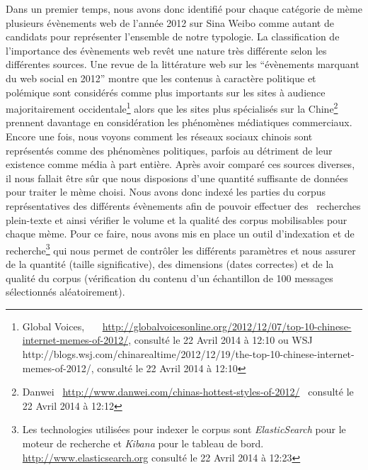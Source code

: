 Dans un premier temps, nous avons donc identifi\'e pour chaque
cat\'egorie de m\`eme plusieurs \'ev\`enements web de
l{\textquoteright}ann\'ee 2012 sur Sina Weibo comme autant de candidats
pour repr\'esenter l{\textquoteright}ensemble de notre typologie. La
classification de l{\textquoteright}importance des \'ev\`enements web
rev\^et une nature tr\`es diff\'erente selon les diff\'erentes sources.
Une revue de la litt\'erature web sur les
{\textquotedblleft}\'ev\`enements marquant du web social en
2012{\textquotedblright} montre que les contenus \`a caract\`ere
politique et pol\'emique sont consid\'er\'es comme plus importants sur
les sites \`a audience majoritairement occidentale\footnote{ Global
Voices,
\ \ \ \url{http://globalvoicesonline.org/2012/12/07/top-10-chinese-internet-memes-of-2012/,}
consult\'e le 22 Avril 2014 \`a 12:10 ou WSJ
http://blogs.wsj.com/chinarealtime/2012/12/19/the-top-10-chinese-internet-memes-of-2012/,
consult\'e le 22 Avril 2014 \`a 12:10 } alors que les sites plus
sp\'ecialis\'es sur la Chine\footnote{ Danwei
\ \url{http://www.danwei.com/chinas-hottest-styles-of-2012/}
\ consult\'e le 22 Avril 2014 \`a 12:12} prennent davantage en
consid\'eration les ph\'enom\`enes m\'ediatiques commerciaux. Encore
une fois, nous voyons comment les r\'eseaux sociaux chinois sont
repr\'esent\'es comme des ph\'enom\`enes politiques, parfois au
d\'etriment de leur existence comme m\'edia \`a part enti\`ere. Apr\`es
avoir compar\'e ces sources diverses, il nous fallait \^etre s\^ur que
nous disposions d{\textquoteright}une quantit\'e suffisante de
donn\'ees pour traiter le m\`eme choisi. Nous avons donc index\'e les
parties du corpus repr\'esentatives des diff\'erents \'ev\`enements
afin de pouvoir effectuer des \ recherches plein-texte et ainsi
v\'erifier le volume et la qualit\'e des corpus mobilisables pour
chaque m\`eme. Pour ce faire, nous avons mis en place un outil
d{\textquoteright}indexation et de recherche\footnote{ Les technologies
utilis\'ees pour indexer le corpus sont \textit{ElasticSearch }pour le
moteur de recherche et \textit{Kibana} pour le tableau de bord.
\url{http://www.elasticsearch.org} consult\'e le 22 Avril 2014 \`a
12:23} qui nous permet de contr\^oler les diff\'erents param\`etres et
nous assurer de la quantit\'e (taille significative), des dimensions
(dates correctes) et de la qualit\'e du corpus (v\'erification du
contenu d{\textquoteright}un \'echantillon de 100 messages
s\'electionn\'es al\'eatoirement).


